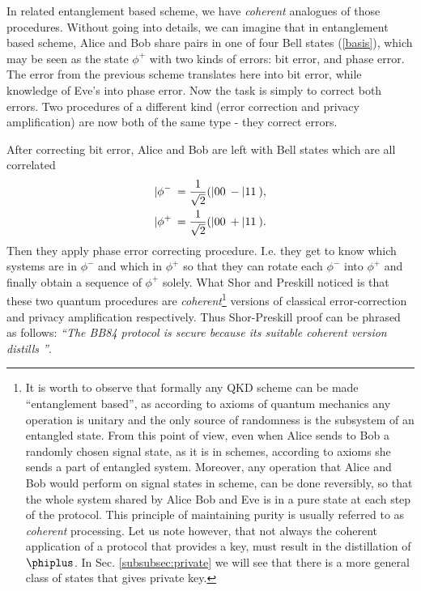 \documentclass[twocolumn,aps,rmp]{revtex4}
\begin{document}
In related entanglement based scheme, we have {\it coherent} analogues
of those procedures. Without going into details, we can imagine that
in entanglement based scheme, Alice and Bob share pairs in one of four
Bell states (\ref{basis}), which may be seen as the state $\phi^+$
with two kinds of errors: bit error, and phase error.
The error from the previous scheme translates here into
bit error, while knowledge of Eve's into phase error.
Now the task is simply to correct both errors.
Two procedures of a different kind (error correction
and privacy amplification)
are now both of the same type - they correct errors.

After correcting bit error, Alice and Bob are left with Bell states which are all
correlated
\begin{eqnarray}
|\phi^{-}\> = {1\over {\sqrt 2}}(|00\> - |11\>),\nonumber \\
|\phi^{+}\> = {1\over {\sqrt 2}}(|00\> + |11\>).
\label{eq:correlBell}
\end{eqnarray}
Then they apply phase error correcting procedure. I.e. they get to
know which systems are in $\phi^{-}$ and which in $\phi^{+}$ so
that they can rotate each $\phi^-$ into $\phi^{+}$ and finally
obtain a sequence of $\phi^+$ solely. What Shor and Preskill noticed is
that these two quantum procedures are {\it coherent}\footnote{It is worth to observe that formally any QKD
  scheme can be made ``entanglement based'', as according to axioms of
  quantum mechanics any operation is unitary and the only source of
  randomness is the subsystem of an entangled state.  From this point
  of view, even when Alice sends to Bob a randomly chosen signal
  state, as it is in \pmp schemes, according to axioms she sends a
  part of entangled system. Moreover, any operation that Alice and Bob
  would perform on signal states in \pmp scheme, can be done
  reversibly, so that the whole system shared by Alice Bob and Eve is
  in a pure state at each step of the protocol. This principle of
  maintaining purity is usually referred to as {\it coherent}
  processing. Let us note however, that not always the coherent
  application of a protocol that provides a key, must result in the
  distillation of $\phiplus$. In Sec. \ref{subsubsec:private} we will
  see that there is a more general class of states that gives private
  key.} versions of
classical error-correction and privacy amplification
respectively. Thus Shor-Preskill proof can be phrased as follows: {\it
  ``The BB84 protocol is secure because its suitable coherent version
  distills \eprstates''}.
\end{document}
